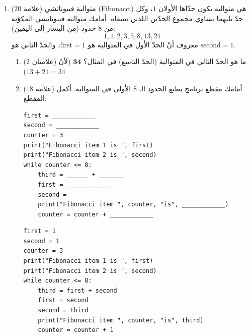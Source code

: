 \documentclass[14pt]{extarticle}
\begin{document}
\begin{enumerate}[resume, label=\textbf{السؤال \arabic*:}, wide=0pt, itemsep=2.2em]
\item ($20$ علامة) متوالية فيبوناتشي (\textenglish{Fibonacci}) هي متوالية يكون حدّاها الأولان $1$، وكل حدّ يليهما يساوي مجموع الحدّين اللذين سبقاه.
أمامك متوالية فيبوناتشي المكوّنة من $8$ حدود (من اليسار إلى اليمين):
$$1, 1, 2, 3, 5, 8, 13, 21$$
معروف أنّ الحدّ الأول في المتوالية هو $\text{first} = 1$، والحدّ الثاني هو $\text{second} = 1$.

\begin{enumerate}[label=\alph*.]
\item ($2$ علامتان) ما هو الحدّ التالي في المتوالية (الحدّ التاسع) في المثال؟ \ifwithsols $\mathbf{34}$ (لأنّ $13 + 21 = 34$) \else \underline{\hspace{3cm}} \fi
\filbreak

\item ($18$ علامة) أمامك مقطع برنامج يطبع الحدود الـ $8$ الأولى في المتوالية. أكمل المقطع:

\begin{boxCode}
\begin{english}
\begin{verbatim}
first = ____________
second = ____________
counter = 3
print("Fibonacci item 1 is ", first)
print("Fibonacci item 2 is ", second)
while counter <= 8:
    third = ______ + _______
    first = ____________
    second = ____________
    print("Fibonacci item ", counter, "is", ____________)
    counter = counter + ____________
\end{verbatim}
\end{english}
\end{boxCode}

\ifwithsols
\begin{boxSolution}
\begin{english}
\begin{verbatim}
first = 1
second = 1
counter = 3
print("Fibonacci item 1 is ", first)
print("Fibonacci item 2 is ", second)
while counter <= 8:
    third = first + second
    first = second
    second = third
    print("Fibonacci item ", counter, "is", third)
    counter = counter + 1
\end{verbatim}
\end{english}
\end{boxSolution}
\fi
\filbreak
\end{enumerate}
\filbreak


\end{enumerate}
\end{document}
